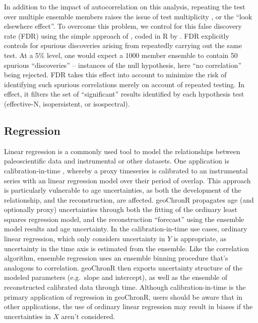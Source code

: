 \documentclass[gchron, manuscript]{copernicus}
\begin{document}
In addition to the impact of autocorrelation on this analysis, repeating
the test over multiple ensemble members raises the issue of test
multiplicity \citep{Ventura2004}, or the ``look elsewhere effect''. To
overcome this problem, we control for this false discovery rate (FDR)
using the simple approach of \citet{BenjaminiHochberg95}, coded in R by
\citet{Ventura2004}. FDR explicitly controls for spurious discoveries
arising from repeatedly carrying out the same test. At a 5\% level, one
would expect a 1000 member ensemble to contain 50 spurious
``discoveries'' -- instances of the null hypothesis, here ``no
correlation'' being rejected. FDR takes this effect into account to
minimize the risk of identifying such spurious correlations merely on
account of repeated testing. In effect, it filters the set of
``significant'' results identified by each hypothesis test (effective-N,
isopersistent, or isospectral).

\subsection{Regression}

Linear regression is a commonly used tool to model the relationships
between paleoscientific data and instrumental or other datasets. One
application is calibration-in-time \citep{grosjean2009calibration},
whereby a proxy timeseries is calibrated to an instrumental series with
an linear regression model over their period of overlap. This approach
is particularly vulnerable to age uncertainties, as both the development
of the relationship, and the reconstruction, are affected. geoChronR
propagates age (and optionally proxy) uncertainties through both the
fitting of the ordinary least squares regression model, and the
reconstruction ``forecast'' using the ensemble model results and age
uncertainty. In the calibration-in-time use cases, ordinary linear
regression, which only considers uncertainty in \(Y\) is appropriate, as
uncertainty in the time axis is estimated from the ensemble. Like the
correlation algorithm, ensemble regression uses an ensemble binning
procedure that's analogous to correlation. geoChronR then exports
uncertainty structure of the modeled parameters (e.g.~slope and
intercept), as well as the ensemble of reconstructed calibrated data
through time. Although calibration-in-time is the primary application of
regression in geoChronR, users should be aware that in other
applications, the use of ordinary linear regression may result in biases
if the uncertainties in \(X\) aren't considered.
\end{document}
